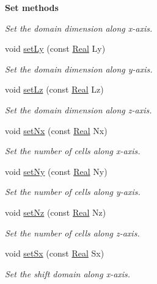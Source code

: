 \begin{Indent}{\bf Set methods}
\begin{DoxyCompactItemize}
\begin{DoxyCompactList}\small\item\em Set the domain dimension along x-\/axis. \end{DoxyCompactList}\item 
void \hyperlink{classFVCode3D_1_1Data_a7b6aec70d4fd53ecb0829c1ec700e6f1}{set\+Ly} (const \hyperlink{namespaceFVCode3D_a40c1f5588a248569d80aa5f867080e83}{Real} Ly)
\begin{DoxyCompactList}\small\item\em Set the domain dimension along y-\/axis. \end{DoxyCompactList}\item 
void \hyperlink{classFVCode3D_1_1Data_ae7485872faf9c0d277e240a6a1f43dcf}{set\+Lz} (const \hyperlink{namespaceFVCode3D_a40c1f5588a248569d80aa5f867080e83}{Real} Lz)
\begin{DoxyCompactList}\small\item\em Set the domain dimension along z-\/axis. \end{DoxyCompactList}\item 
void \hyperlink{classFVCode3D_1_1Data_a2cf14ed455819e6161b7d32ce9e6eba6}{set\+Nx} (const \hyperlink{namespaceFVCode3D_a40c1f5588a248569d80aa5f867080e83}{Real} Nx)
\begin{DoxyCompactList}\small\item\em Set the number of cells along x-\/axis. \end{DoxyCompactList}\item 
void \hyperlink{classFVCode3D_1_1Data_a768fd7e5bcb3d590aca98dafddb4b982}{set\+Ny} (const \hyperlink{namespaceFVCode3D_a40c1f5588a248569d80aa5f867080e83}{Real} Ny)
\begin{DoxyCompactList}\small\item\em Set the number of cells along y-\/axis. \end{DoxyCompactList}\item 
void \hyperlink{classFVCode3D_1_1Data_a3d164db50b46d7b0488a00db529fa3b6}{set\+Nz} (const \hyperlink{namespaceFVCode3D_a40c1f5588a248569d80aa5f867080e83}{Real} Nz)
\begin{DoxyCompactList}\small\item\em Set the number of cells along z-\/axis. \end{DoxyCompactList}\item 
void \hyperlink{classFVCode3D_1_1Data_a5b561f1dd14069d1ba7fa79ba5b09d47}{set\+Sx} (const \hyperlink{namespaceFVCode3D_a40c1f5588a248569d80aa5f867080e83}{Real} Sx)
\begin{DoxyCompactList}\small\item\em Set the shift domain along x-\/axis. \end{DoxyCompactList}\item 

\end{DoxyCompactItemize}
\end{Indent}
